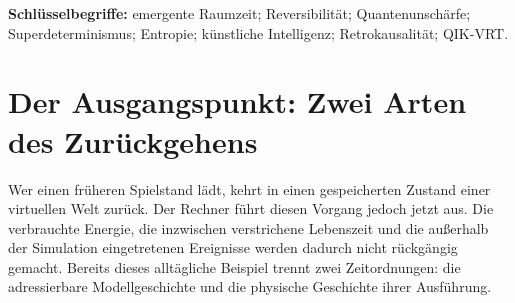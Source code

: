 \renewcommand{\langtag}{de}
\begin{abstract}
Eine virtuelle Welt kann ihren Anfangszustand, ihre Regeln und ihre Eingaben so bewahren, dass frühere Zustände exakt wiederherstellbar sind. Die physische Welt bietet einem in ihr handelnden Beobachter keinen vergleichbaren vollständigen Zugriff. Aus dieser Asymmetrie lässt sich ein präziser Zusammenhang zwischen Berechnung, Entropie, Quantenmechanik und Zeit entwickeln. Der vorliegende Beitrag unterscheidet deterministische Entwicklung, logische Umkehrbarkeit, epistemische Rekonstruktion und physische Rückwärtswirkung. Er definiert virtuelle Entropie relativ zu einem Beobachter und zeigt, weshalb künstliche Intelligenz dessen Unsicherheit verändern kann, ohne aus Determinismus ontischen Zufall zu erzeugen. Ansätze emergenter Raumzeit eröffnen darüber hinaus die Frage, ob Geometrie aus grundlegenderen Relationen hervorgeht. Lichtkegel und Unschärferelation erfüllen dabei verschiedene Aufgaben: Der erste begrenzt relativistische Erreichbarkeit, die zweite die gleichzeitige Schärfe bestimmter Quantengrößen. Den Abschluss bilden ein überprüfbares Forschungsprogramm und eine naturphilosophische Deutung von Leben, Endlichkeit und Verantwortung. Lohmanns Ablehnung eines vollständig vorbestimmten realen Universums wird als Leitthese aufgenommen; ein experimenteller Ausschluss sämtlicher superdeterministischer Modelle wird daraus nicht abgeleitet.
\end{abstract}
\noindent\textbf{Schlüsselbegriffe:} emergente Raumzeit; Reversibilität; Quantenunschärfe; Superdeterminismus; Entropie; künstliche Intelligenz; Retrokausalität; QIK-VRT.

\section{Der Ausgangspunkt: Zwei Arten des Zurückgehens}\label{de:sec1}
Wer einen früheren Spielstand lädt, kehrt in einen gespeicherten Zustand einer virtuellen Welt zurück. Der Rechner führt diesen Vorgang jedoch jetzt aus. Die verbrauchte Energie, die inzwischen verstrichene Lebenszeit und die außerhalb der Simulation eingetretenen Ereignisse werden dadurch nicht rückgängig gemacht. Bereits dieses alltägliche Beispiel trennt zwei Zeitordnungen: die adressierbare Modellgeschichte und die physische Geschichte ihrer Ausführung.


